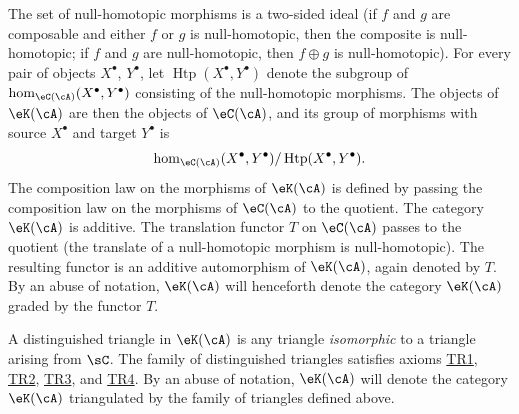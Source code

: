 \documentclass[oneside]{book}
\begin{document}
\subsubsection{}\label{VIII:1-2-2}

The set of null-homotopic morphisms is a two-sided ideal (if $f$ and $g$
are composable and either $f$ or $g$ is null-homotopic, then the composite
is null-homotopic; if $f$ and $g$ are null-homotopic, then
$f\oplus g$ is null-homotopic). For every pair of objects $X^\bullet$,
$Y^\bullet$, let $\operatorname{Htp}(X^\bullet,Y^\bullet)$ denote the
subgroup of $\hom_{\eC(\cA)}(X^\bullet,Y^\bullet)$ consisting of the
null-homotopic morphisms. The objects of $\eK(\cA)$ are then the objects
of $\eC(\cA)$, and its group of morphisms with source $X^\bullet$ and
target $Y^\bullet$ is
\[
  \hom_{\eC(\cA)}(X^\bullet,Y^\bullet) / \operatorname{Htp}(X^\bullet,Y^\bullet) \text{.}
\]
The composition law on the morphisms of $\eK(\cA)$ is defined by passing
the composition law on the morphisms of $\eC(\cA)$ to the quotient.
The category $\eK(\cA)$ is additive. The translation functor $T$ on
$\eC(\cA)$ passes to the quotient (the translate of a null-homotopic
morphism is null-homotopic). The resulting functor is an additive
automorphism of $\eK(\cA)$, again denoted by $T$. By an abuse of notation,
$\eK(\cA)$ will henceforth denote the category $\eK(\cA)$ graded by the
functor $T$.

A distinguished triangle in $\eK(\cA)$ is any triangle \emph{isomorphic}
to a triangle arising from $\sC$. The family of distinguished triangles
satisfies axioms \hyperlink{VIII:TR1}{TR1},
\hyperlink{VIII:TR2}{TR2}, \hyperlink{VIII:TR3}{TR3}, and
\hyperlink{VIII:TR4}{TR4}. By an abuse of notation, $\eK(\cA)$ will denote
the category $\eK(\cA)$ triangulated by the family of triangles defined
above.

\subsubsection{}\label{VIII:1-2-3}
\end{document}
